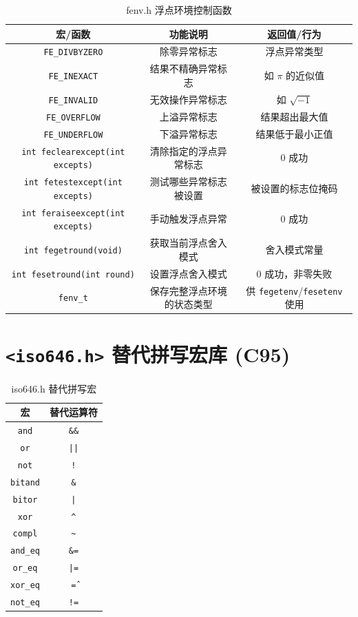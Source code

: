 \begin{table}[H]
\centering
\small
\renewcommand{\arraystretch}{1.5}
\begin{tabulary}{\linewidth}{CCC}
\toprule
\textbf{宏/函数} & \textbf{功能说明} & \textbf{返回值/行为} \\ \midrule
\texttt{FE\_DIVBYZERO} & 除零异常标志 & 浮点异常类型 \\ 
\texttt{FE\_INEXACT} & 结果不精确异常标志 & 如 $\pi$ 的近似值 \\ 
\texttt{FE\_INVALID} & 无效操作异常标志 & 如 $\sqrt{-1}$ \\ 
\texttt{FE\_OVERFLOW} & 上溢异常标志 & 结果超出最大值 \\ 
\texttt{FE\_UNDERFLOW} & 下溢异常标志 & 结果低于最小正值 \\ 
\texttt{int feclearexcept(int excepts)} & 清除指定的浮点异常标志 & 0 成功 \\ 
\texttt{int fetestexcept(int excepts)} & 测试哪些异常标志被设置 & 被设置的标志位掩码 \\ 
\texttt{int feraiseexcept(int excepts)} & 手动触发浮点异常 & 0 成功 \\ 
\texttt{int fegetround(void)} & 获取当前浮点舍入模式 & 舍入模式常量 \\ 
\texttt{int fesetround(int round)} & 设置浮点舍入模式 & 0 成功，非零失败 \\ 
\texttt{fenv\_t} & 保存完整浮点环境的状态类型 & 供 \texttt{fegetenv}/\texttt{fesetenv} 使用 \\ \bottomrule
\end{tabulary}
\caption{fenv.h 浮点环境控制函数}
\label{tab:fenv}
\end{table}

\section{\texorpdfstring{\texttt{<iso646.h>} 替代拼写宏库 (C95)}{<iso646.h> 替代拼写宏库 (C95)}}

\begin{table}[H]
\centering
\small
\renewcommand{\arraystretch}{1.5}
\begin{tabulary}{\linewidth}{CC}
\toprule
\textbf{宏} & \textbf{替代运算符} \\ \midrule
\texttt{and} & \texttt{\&\&} \\ 
\texttt{or} & \texttt{||} \\ 
\texttt{not} & \texttt{!} \\ 
\texttt{bitand} & \texttt{\&} \\ 
\texttt{bitor} & \texttt{|} \\ 
\texttt{xor} & \texttt{\^} \\ 
\texttt{compl} & \texttt{\textasciitilde} \\ 
\texttt{and\_eq} & \texttt{\&=} \\ 
\texttt{or\_eq} & \texttt{|=} \\ 
\texttt{xor\_eq} & \texttt{\^=} \\ 
\texttt{not\_eq} & \texttt{!=} \\ \bottomrule
\end{tabulary}
\caption{iso646.h 替代拼写宏}
\label{tab:iso646}
\end{table}
